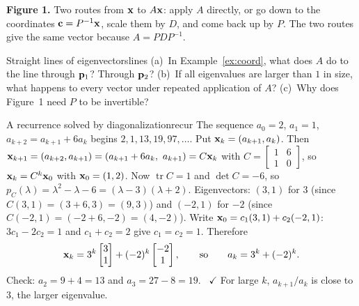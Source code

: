 \documentclass[11pt]{article}
\begin{document}
\noindent\textbf{Figure 1.} Two routes from $\mathbf{x}$ to $A\mathbf{x}$: apply $A$ directly, or go down to the coordinates $\mathbf{c}=P^{-1}\mathbf{x}$, scale them by $D$, and come back up by $P$. The two routes give the same vector because $A=PDP^{-1}$.

\begin{think}{Straight lines of eigenvectors}{lines}
(a)~In Example~\ref{ex:coord}, what does $A$ do to the line through $\mathbf{p}_1$? Through $\mathbf{p}_2$? (b)~If all eigenvalues are larger than $1$ in size, what happens to every vector under repeated application of $A$? (c)~Why does Figure~1 need $P$ to be invertible?
\end{think}

\begin{exmp}{A recurrence solved by diagonalization}{recur}
The sequence $a_0=2$, $a_1=1$, $a_{k+2}=a_{k+1}+6a_k$ begins $2,1,13,19,97,\dots$. Put $\mathbf{x}_k=(a_{k+1},a_k)$. Then $\bv{x}_{k+1}=(a_{k+2},a_{k+1})=(a_{k+1}+6a_k,\ a_{k+1})=C\bv{x}_k$ with $C=\begin{bmatrix}1&6\\1&0\end{bmatrix}$, so $\mathbf{x}_k=C^k\mathbf{x}_0$ with $\mathbf{x}_0=(1,2)$. Now $\operatorname{tr}C=1$ and $\det C=-6$, so $p_C(\lambda)=\lambda^2-\lambda-6=(\lambda-3)(\lambda+2)$. Eigenvectors: $(3,1)$ for $3$ (since $C(3,1)=(3+6,3)=(9,3)$) and $(-2,1)$ for $-2$ (since $C(-2,1)=(-2+6,-2)=(4,-2)$). Write $\mathbf{x}_0=c_1(3,1)+c_2(-2,1)$: $3c_1-2c_2=1$ and $c_1+c_2=2$ give $c_1=c_2=1$. Therefore
\[
\mathbf{x}_k=3^k\begin{bmatrix}3\\1\end{bmatrix}+(-2)^k\begin{bmatrix}-2\\1\end{bmatrix},\qquad\text{so}\qquad a_k=3^k+(-2)^k.
\]
Check: $a_2=9+4=13$ and $a_3=27-8=19$. \ $\checkmark$ For large $k$, $a_{k+1}/a_k$ is close to $3$, the larger eigenvalue.
\end{exmp}
\end{document}
